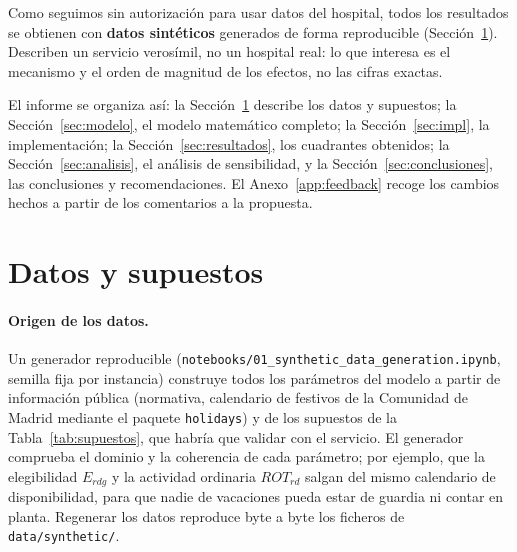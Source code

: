 Como seguimos sin autorización para usar datos del hospital, todos los resultados se obtienen con \textbf{datos sintéticos} generados de forma reproducible (Sección~\ref{sec:datos}). Describen un servicio verosímil, no un hospital real: lo que interesa es el mecanismo y el orden de magnitud de los efectos, no las cifras exactas.

El informe se organiza así: la Sección~\ref{sec:datos} describe los datos y supuestos; la Sección~\ref{sec:modelo}, el modelo matemático completo; la Sección~\ref{sec:impl}, la implementación; la Sección~\ref{sec:resultados}, los cuadrantes obtenidos; la Sección~\ref{sec:analisis}, el análisis de sensibilidad, y la Sección~\ref{sec:conclusiones}, las conclusiones y recomendaciones. El Anexo~\ref{app:feedback} recoge los cambios hechos a partir de los comentarios a la propuesta.

\section{Datos y supuestos}
\label{sec:datos}

\paragraph{Origen de los datos.} Un generador reproducible (\texttt{notebooks/01\_synthetic\_data\_generation.ipynb}, semilla fija por instancia) construye todos los parámetros del modelo a partir de información pública (normativa, calendario de festivos de la Comunidad de Madrid mediante el paquete \texttt{holidays}) y de los supuestos de la Tabla~\ref{tab:supuestos}, que habría que validar con el servicio. El generador comprueba el dominio y la coherencia de cada parámetro; por ejemplo, que la elegibilidad $E_{rdg}$ y la actividad ordinaria $ROT_{rd}$ salgan del mismo calendario de disponibilidad, para que nadie de vacaciones pueda estar de guardia ni contar en planta. Regenerar los datos reproduce byte a byte los ficheros de \texttt{data/synthetic/}.

